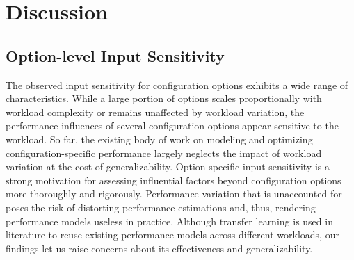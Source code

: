 {


\vspace{1mm}

\section{Discussion}
{\color{edited}
\subsection{Option-level Input Sensitivity}

The observed input sensitivity for configuration options exhibits a wide range of characteristics. While a large portion of options scales proportionally with workload complexity or remains unaffected by workload variation, the performance influences of several configuration options appear sensitive to the workload.  So far, the existing body of work on modeling and optimizing configuration-specific performance largely neglects the impact of workload variation at the cost of generalizability. Option-specific input sensitivity is a strong motivation for assessing influential factors beyond configuration options more thoroughly and rigorously. Performance variation that is unaccounted for poses the risk of distorting performance estimations and, thus, rendering performance models useless in practice. Although transfer learning is used in literature to reuse existing performance models across different workloads, our findings let us raise concerns about its effectiveness and generalizability. 

}}
